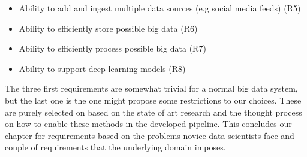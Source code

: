 \begin{itemize}
  \item Ability to add and ingest multiple data sources (e.g social media feeds) (R5)
  \item Ability to efficiently store possible big data (R6)
  \item Ability to efficiently process possible big data (R7)
  \item Ability to support deep learning models (R8)
\end{itemize}

The three first requirements are somewhat trivial for a normal big data system, but the last one is the one might propose some restrictions to our choices.
These are purely selected on based on the state of art research and the thought process on how to enable these methods in the developed pipeline.
This concludes our chapter for requirements based on the problems novice data scientists face and couple of requirements that the underlying domain imposes.
